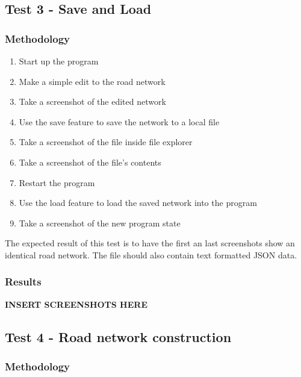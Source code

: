    \subsection{Test 3 - Save and Load}

        \subsubsection{Methodology}

            \begin{enumerate}
                \item Start up the program
                \item Make a simple edit to the road network
                \item Take a screenshot of the edited network
                \item Use the save feature to save the network to a local file
                \item Take a screenshot of the file inside file explorer
                \item Take a screenshot of the file's contents
                \item Restart the program
                \item Use the load feature to load the saved network into the program
                \item Take a screenshot of the new program state
            \end{enumerate}

            The expected result of this test is to have the first an last screenshots show an identical road network. The file should also contain text formatted JSON data.

            \subsubsection{Results}

                \textbf{INSERT SCREENSHOTS HERE}

    \subsection{Test 4 - Road network construction}

        \subsubsection{Methodology}

